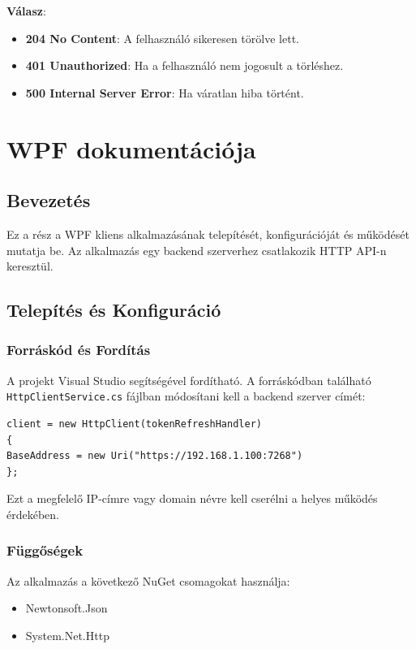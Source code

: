 \documentclass{report}[11pt]
\begin{document}
\textbf{Válasz}:  
\begin{itemize}
    \item \textbf{204 No Content}: A felhasználó sikeresen törölve lett.
    \item \textbf{401 Unauthorized}: Ha a felhasználó nem jogosult a törléshez.
    \item \textbf{500 Internal Server Error}: Ha váratlan hiba történt.
\end{itemize}



\chapter{WPF dokumentációja}

\section{Bevezetés}
Ez a rész a WPF kliens alkalmazásának telepítését, konfigurációját és működését mutatja be. Az alkalmazás egy backend szerverhez csatlakozik HTTP API-n keresztül.

\section{Telepítés és Konfiguráció}
\subsection{Forráskód és Fordítás}
A projekt Visual Studio segítségével fordítható. A forráskódban található \texttt{HttpClientService.cs} fájlban módosítani kell a backend szerver címét:

\begin{verbatim}
client = new HttpClient(tokenRefreshHandler)
{
BaseAddress = new Uri("https://192.168.1.100:7268")
};
\end{verbatim}

Ezt a megfelelő IP-címre vagy domain névre kell cserélni a helyes működés érdekében.

\subsection{Függőségek}
Az alkalmazás a következő NuGet csomagokat használja:
\begin{itemize}
\item Newtonsoft.Json
\item System.Net.Http
\end{itemize}
\end{document}
